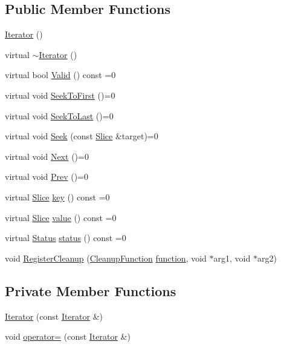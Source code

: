 \subsection*{Public Member Functions}
\begin{DoxyCompactItemize}
\item 
\hyperlink{classleveldb_1_1_iterator_a1dc1cbc893e55a3fc990f08cf191480a}{Iterator} ()
\item 
virtual \hyperlink{classleveldb_1_1_iterator_a2c9ce32aa57b2202d1e0d4a38c2676a1}{$\sim$\-Iterator} ()
\item 
virtual bool \hyperlink{classleveldb_1_1_iterator_a38614978bfa0586327b8e237bcb46012}{Valid} () const =0
\item 
virtual void \hyperlink{classleveldb_1_1_iterator_a3594967cf26ddf1d37c7b886bb48627e}{Seek\-To\-First} ()=0
\item 
virtual void \hyperlink{classleveldb_1_1_iterator_a8ad637f0a759e6d94cca6c5b4db440d3}{Seek\-To\-Last} ()=0
\item 
virtual void \hyperlink{classleveldb_1_1_iterator_a97a556e97ded60c677fbf4de7321ec44}{Seek} (const \hyperlink{classleveldb_1_1_slice}{Slice} \&target)=0
\item 
virtual void \hyperlink{classleveldb_1_1_iterator_aea54a5ca7eb942eb15770820529410e7}{Next} ()=0
\item 
virtual void \hyperlink{classleveldb_1_1_iterator_a28798d802a203788587dc6adc5bc729e}{Prev} ()=0
\item 
virtual \hyperlink{classleveldb_1_1_slice}{Slice} \hyperlink{classleveldb_1_1_iterator_ad17feced6e24a1b21db5ae6940c1f220}{key} () const =0
\item 
virtual \hyperlink{classleveldb_1_1_slice}{Slice} \hyperlink{classleveldb_1_1_iterator_a613ac2e965518aad7a064c64c72bcf7c}{value} () const =0
\item 
virtual \hyperlink{classleveldb_1_1_status}{Status} \hyperlink{classleveldb_1_1_iterator_ac84f34623a031b7eeb23409320f76376}{status} () const =0
\item 
void \hyperlink{classleveldb_1_1_iterator_a8c0281f9e4a2c9dceb37aad8128b636f}{Register\-Cleanup} (\hyperlink{classleveldb_1_1_iterator_a3bb875a5d70208c14bcbd785c24e334f}{Cleanup\-Function} \hyperlink{env__posix_8cc_a3af771e282b88e6dca0215c6c890ae75}{function}, void $\ast$arg1, void $\ast$arg2)
\end{DoxyCompactItemize}
\subsection*{Private Member Functions}
\begin{DoxyCompactItemize}
\item 
\hyperlink{classleveldb_1_1_iterator_a6bbdbbdd8d98fa68335d0c6be23192d3}{Iterator} (const \hyperlink{classleveldb_1_1_iterator}{Iterator} \&)
\item 
void \hyperlink{classleveldb_1_1_iterator_ae34607d7e20f4b74914d21e8ab2402ca}{operator=} (const \hyperlink{classleveldb_1_1_iterator}{Iterator} \&)
\end{DoxyCompactItemize}
